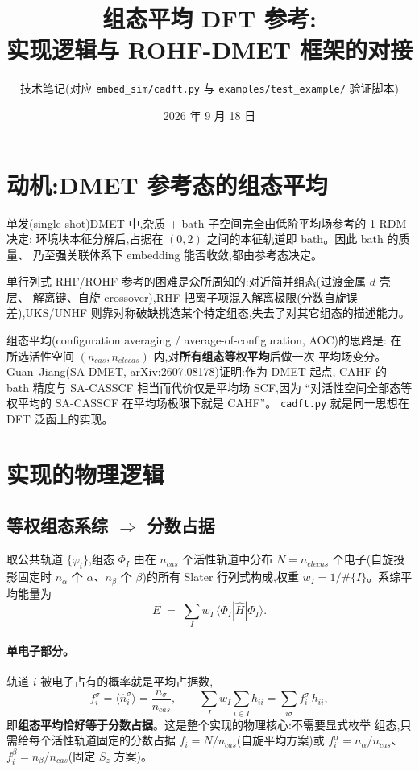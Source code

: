 \documentclass[11pt,a4paper]{ctexart}
\title{\bfseries 组态平均 DFT 参考:\\实现逻辑与 ROHF-DMET 框架的对接}
\author{技术笔记(对应 \texttt{embed\_sim/cadft.py} 与 \texttt{examples/test\_example/} 验证脚本)}
\date{2026 年 9 月 18 日}
\begin{document}
\maketitle

\tableofcontents

\section{动机:DMET 参考态的组态平均}

单发(single-shot)DMET 中,杂质 + bath 子空间完全由低阶平均场参考的 1-RDM 决定:
环境块本征分解后,占据在 $(0,2)$ 之间的本征轨道即 bath。因此 bath 的质量、
乃至强关联体系下 embedding 能否收敛,都由参考态决定。

单行列式 RHF/ROHF 参考的困难是众所周知的:对近简并组态(过渡金属 $d$ 壳层、
解离键、自旋 crossover),RHF 把离子项混入解离极限(分数自旋误差),UKS/UNHF
则靠对称破缺挑选某个特定组态,失去了对其它组态的描述能力。

组态平均(configuration averaging / average-of-configuration, AOC)的思路是:
在所选活性空间 $(n_{cas}, n_{elecas})$ 内,对\textbf{所有组态等权平均}后做一次
平均场变分。Guan--Jiang(SA-DMET, arXiv:2607.08178)证明:作为 DMET 起点,
CAHF 的 bath 精度与 SA-CASSCF 相当而代价仅是平均场 SCF,因为
``对活性空间全部态等权平均的 SA-CASSCF 在平均场极限下就是 CAHF''。
\texttt{cadft.py} 就是同一思想在 DFT 泛函上的实现。

\section{实现的物理逻辑}

\subsection{等权组态系综 $\Rightarrow$ 分数占据}

取公共轨道 $\{\varphi_i\}$,组态 $\Phi_I$ 由在 $n_{cas}$ 个活性轨道中分布
$N=n_{elecas}$ 个电子(自旋投影固定时 $n_\alpha$ 个 $\alpha$、$n_\beta$ 个
$\beta$)的所有 Slater 行列式构成,权重 $w_I = 1/\#\{I\}$。系综平均能量为
\begin{equation}
  \bar E \;=\; \sum_I w_I \,\langle \Phi_I | \hat H | \Phi_I \rangle .
  \label{eq:ens}
\end{equation}

\paragraph{单电子部分。}轨道 $i$ 被电子占有的概率就是平均占据数,
\begin{equation}
  f_i^\sigma = \langle \hat n_i^\sigma\rangle = \frac{n_\sigma}{n_{cas}},
  \qquad
  \sum_I w_I \sum_{i\in I} h_{ii} = \sum_{i\sigma} f_i^\sigma\, h_{ii}^{},
\end{equation}
即\textbf{组态平均恰好等于分数占据}。这是整个实现的物理核心:不需要显式枚举
组态,只需给每个活性轨道固定的分数占据 $f_i = N/n_{cas}$(自旋平均方案)或
$f_i^\alpha = n_\alpha/n_{cas}$、$f_i^\beta = n_\beta/n_{cas}$(固定 $S_z$ 方案)。
\end{document}
